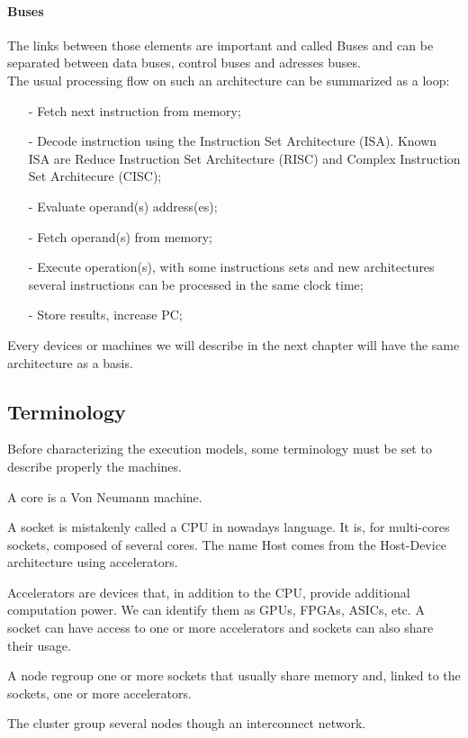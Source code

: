 \paragraph{Buses}
The links between those elements are important and called Buses and can be separated between data buses, control buses and adresses buses.\\

The usual processing flow on such an architecture can be summarized as a loop: 
\begin{itemize}[noitemsep,nolistsep]
\item[-] Fetch next instruction from memory;
\item[-] Decode instruction using the Instruction Set Architecture (ISA). Known ISA are Reduce Instruction Set Architecture (RISC) and Complex Instruction Set Architecure (CISC);
\item[-] Evaluate operand(s) address(es);
\item[-] Fetch operand(s) from memory;
\item[-] Execute operation(s), with some instructions sets and new architectures several instructions can be processed in the same clock time;
\item[-] Store results, increase PC; 
\end{itemize}

Every devices or machines we will describe in the next chapter will have the same architecture as a basis. 

\subsection{Terminology}
Before characterizing the execution models, some terminology must be set to describe properly the machines. 

\begin{description}
\item[Core:] A core is a Von Neumann machine. 
\item[Socket/Host:] A socket is mistakenly called a CPU in nowadays language. It is, for multi-cores sockets, composed of several cores. The name Host comes from the Host-Device architecture using accelerators. 
\item[Accelerators/Devices:] Accelerators are devices that, in addition to the CPU, provide additional computation power. We can identify them as GPUs, FPGAs, ASICs, etc. A socket can have access to one or more accelerators and sockets can also share their usage. 
\item[Node:] A node regroup one or more sockets that usually share memory and, linked to the sockets, one or more accelerators. 
\item[Cluster/Supercomputer] The cluster group several nodes though an interconnect network.
\end{description}

